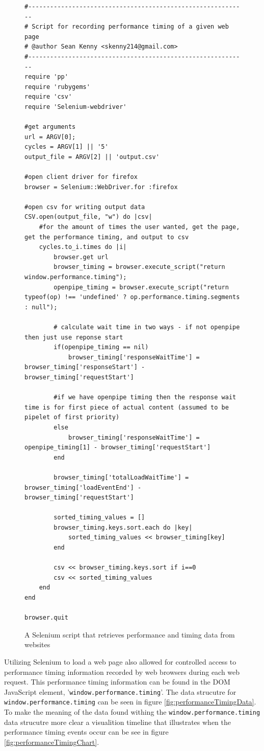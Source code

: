 \documentclass[12pt]{report}
\begin{document}
\begin{figure}[H]
\begin{lstlisting}
#------------------------------------------------------------
# Script for recording performance timing of a given web page
# @author Sean Kenny <skenny214@gmail.com>
#------------------------------------------------------------
require 'pp'
require 'rubygems'
require 'csv'
require 'Selenium-webdriver'

#get arguments
url = ARGV[0];
cycles = ARGV[1] || '5'
output_file = ARGV[2] || 'output.csv'

#open client driver for firefox
browser = Selenium::WebDriver.for :firefox

#open csv for writing output data
CSV.open(output_file, "w") do |csv|
	#for the amount of times the user wanted, get the page, get the performance timing, and output to csv
	cycles.to_i.times do |i|	
		browser.get url
		browser_timing = browser.execute_script("return window.performance.timing"); 
		openpipe_timing = browser.execute_script("return typeof(op) !== 'undefined' ? op.performance.timing.segments : null");

		# calculate wait time in two ways - if not openpipe then just use reponse start
		if(openpipe_timing == nil)
			browser_timing['responseWaitTime'] = browser_timing['responseStart'] - browser_timing['requestStart']

		#if we have openpipe timing then the response wait time is for first piece of actual content (assumed to be pipelet of first priority)
		else		
			browser_timing['responseWaitTime'] = openpipe_timing[1] - browser_timing['requestStart']
		end

		browser_timing['totalLoadWaitTime'] = browser_timing['loadEventEnd'] - browser_timing['requestStart'] 
		
		sorted_timing_values = []
		browser_timing.keys.sort.each do |key| 
			sorted_timing_values << browser_timing[key]
		end
		
		csv << browser_timing.keys.sort if i==0
		csv << sorted_timing_values
	end
end

browser.quit
\end{lstlisting}
\caption{A Selenium script that retrieves performance and timing data from websites}
\label{fig:SeleniumScript}
\end{figure}

Utilizing Selenium to load a web page also allowed for controlled access to performance timing information recorded by web browsers during each web request. This performance timing information can be found in the DOM JavaScript element, '\texttt{window.performance.timing}'.  The data strucutre for \texttt{window.performance.timing} can be seen in figure \ref{fig:performanceTimingData}. To make the meaning of the data found withing the \texttt{window.performance.timing} data strucutre more clear a visualition timeline that illustrates when the performance timing events occur can be see in figure \ref{fig:performanceTimingChart}.
\end{document}
